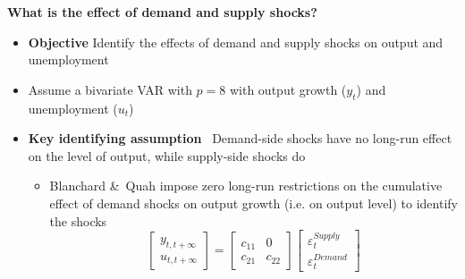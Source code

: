 \documentclass[10pt,english,t,aspectratio=169,ignorenonframetext]{beamer}
\begin{document}
\begin{frame}
{\textbf{What is the effect of demand and supply shocks?}}\bigskip

\begin{itemize}
\item \textbf{Objective} Identify the effects of demand and supply shocks on
output and unemployment\bigskip \pause

\item Assume a bivariate VAR with $p=8$ with output growth ($y_{t}$) and
unemployment ($u_{t}$)\bigskip

\item \textbf{Key identifying assumption} \ Demand-side shocks have no
long-run effect on the level of output, while supply-side shocks do\smallskip

\begin{itemize}
\item Blanchard \&\ Quah impose zero long-run restrictions on the cumulative
effect of demand shocks on output growth (i.e. on output level) to identify
the shocks\medskip 
\begin{equation*}
\begin{bmatrix}
y_{t,t+\infty } \\ 
u_{t,t+\infty }%
\end{bmatrix}%
=\left[ 
\begin{array}{cc}
c_{11} & 0 \\ 
c_{21} & c_{22}%
\end{array}%
\right] 
\begin{bmatrix}
\varepsilon _{t}^{Supply} \\ 
\varepsilon _{t}^{Demand}%
\end{bmatrix}%
\end{equation*}
\end{itemize}
\end{itemize}
\end{frame}

\end{document}
